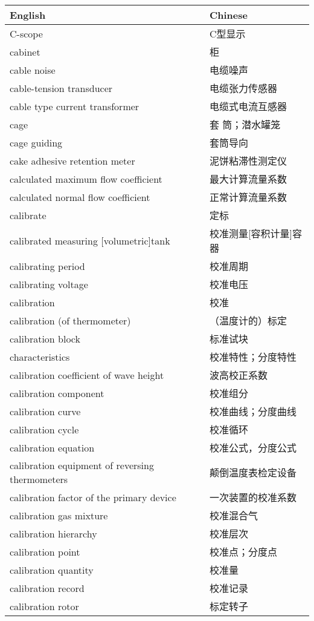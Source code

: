 \documentclass[
]{article}
\begin{document}
\begin{longtable}[]{@{}ll@{}}
\toprule()
English & Chinese \\
\midrule()
\endhead
C-scope & C型显示 \\
cabinet & 柜 \\
cable noise & 电缆噪声 \\
cable-tension transducer & 电缆张力传感器 \\
cable type current transformer & 电缆式电流互感器 \\
cage & 套 筒；潜水罐笼 \\
cage guiding & 套筒导向 \\
cake adhesive retention meter & 泥饼粘滞性测定仪 \\
calculated maximum flow coefficient & 最大计算流量系数 \\
calculated normal flow coefficient & 正常计算流量系数 \\
calibrate & 定标 \\
calibrated measuring {[}volumetric{]}tank & 校准测量{[}容积计量{]}容器 \\
calibrating period & 校准周期 \\
calibrating voltage & 校准电压 \\
calibration & 校准 \\
calibration (of thermometer) & （温度计的）标定 \\
calibration block & 标准试块 \\
characteristics & 校准特性；分度特性 \\
calibration coefficient of wave height & 波高校正系数 \\
calibration component & 校准组分 \\
calibration curve & 校准曲线；分度曲线 \\
calibration cycle & 校准循环 \\
calibration equation & 校准公式，分度公式 \\
calibration equipment of reversing thermometers & 颠倒温度表检定设备 \\
calibration factor of the primary device & 一次装置的校准系数 \\
calibration gas mixture & 校准混合气 \\
calibration hierarchy & 校准层次 \\
calibration point & 校准点；分度点 \\
calibration quantity & 校准量 \\
calibration record & 校准记录 \\
calibration rotor & 标定转子 \\

\end{longtable}
\end{document}
